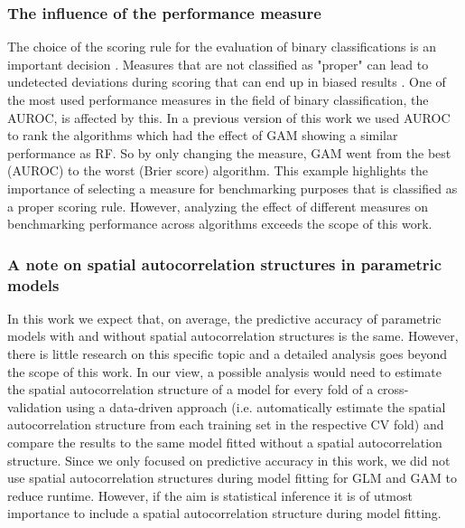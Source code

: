 \documentclass[review]{elsarticle}
\begin{document}
\subsubsection{The influence of the performance measure}
The choice of the scoring rule for the evaluation of binary classifications is an important decision \citep{Gneiting2007}.
Measures that are not classified as "proper" can lead to undetected deviations during scoring that can end up in biased results \citep{Byrne2016}.
One of the most used performance measures in the field of binary classification, the \ac{AUROC}, is affected by this.
In a previous version of this work we used \ac{AUROC} to rank the algorithms which had the effect of GAM showing a similar performance as RF.
So by only changing the measure, GAM went from the best (AUROC) to the worst (Brier score) algorithm.
This example highlights the importance of selecting a measure for benchmarking purposes that is classified as a proper scoring rule.
However, analyzing the effect of different measures on benchmarking performance across algorithms exceeds the scope of this work.

\subsubsection{A note on spatial autocorrelation structures in parametric models}
In this work we expect that, on average, the predictive accuracy of parametric models with and without spatial autocorrelation structures is the same.
However, there is little research on this specific topic \citep{Dormann2007b, Mets2017} and a detailed analysis goes beyond the scope of this work.
In our view, a possible analysis would need to estimate the spatial autocorrelation structure of a model for every fold of a cross-validation using a data-driven approach (i.e. automatically estimate the spatial autocorrelation structure from each training set in the respective CV fold) and compare the results to the same model fitted without a spatial autocorrelation structure.
Since we only focused on predictive accuracy in this work, we did not use spatial autocorrelation structures during model fitting for \ac{GLM} and \ac{GAM} to reduce runtime.
However, if the aim is statistical inference it is of utmost importance to include a spatial autocorrelation structure during model fitting.
\end{document}
